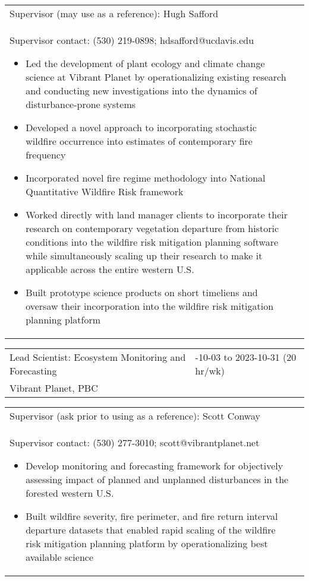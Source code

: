 \documentclass[10pt,english]{article}
\providecommand{\tabularnewline}{\\}
\begin{document}
\renewcommand{\arraystretch}{1.2}
\begin{tabularx}{\textwidth}{@{}>{\raggedright}p{6.25in} >{\raggedleft}X@{}}
\addtolength{\leftskip}{5ex}Supervisor (may use as a reference): Hugh Safford \tabularnewline
\addtolength{\leftskip}{5ex}Supervisor contact: (530) 219-0898; hdsafford@ucdavis.edu
\begin{itemize}
\itemsep0em
\item{Led the development of plant ecology and climate change science at Vibrant Planet by operationalizing existing research and conducting new investigations into the dynamics of disturbance-prone systems}
\item{Developed a novel approach to incorporating stochastic wildfire occurrence into estimates of contemporary fire frequency}
\item{Incorporated novel fire regime methodology into National Quantitative Wildfire Risk framework}
\item{Worked directly with land manager clients to incorporate their research on contemporary vegetation departure from historic conditions into the wildfire risk mitigation planning software while simultaneously scaling up their research to make it applicable across the entire western U.S.}
\item{Built prototype science products on short timeliens and oversaw their incorporation into the wildfire risk mitigation planning platform}
\end{itemize}
\end{tabularx}

\newpage

\renewcommand{\arraystretch}{1.2}
\begin{tabularx}{\textwidth}{@{}>{\raggedright}p{3.75in} >{\raggedleft}X@{}}
Lead Scientist: Ecosystem Monitoring and Forecasting & 2022-10-03 to 2023-10-31 (20 hr/wk) \tabularnewline
Vibrant Planet, PBC & \tabularnewline
\end{tabularx}

\renewcommand{\arraystretch}{1.2}
\begin{tabularx}{\textwidth}{@{}>{\raggedright}p{6.25in} >{\raggedleft}X@{}}
\addtolength{\leftskip}{5ex}Supervisor (ask prior to using as a reference): Scott Conway \tabularnewline
\addtolength{\leftskip}{5ex}Supervisor contact: (530) 277-3010; scott@vibrantplanet.net
\begin{itemize}
\itemsep0em
\item{Develop monitoring and forecasting framework for objectively assessing impact of planned and unplanned disturbances in the forested western U.S.}
\item{Built wildfire severity, fire perimeter, and fire return interval departure datasets that enabled rapid scaling of the wildfire risk mitigation planning platform by operationalizing best available science}
\end{itemize}
\end{tabularx}
\end{document}

